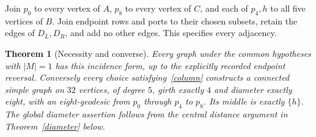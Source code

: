 \documentclass[11pt]{article}
\newtheorem{theorem}{Theorem}
\begin{document}
Join $p_0$ to every vertex of $A$, $p_8$ to every vertex of $C$, and each
of $p_4,h$ to all five vertices of $B$. Join endpoint rows and ports to
their chosen subsets, retain the edges of $D_L,D_R$, and add no other
edges. This specifies every adjacency.

\begin{theorem}[Necessity and converse]\label{normalform}
Every graph under the common hypotheses with $|M|=1$ has this incidence
form, up to the explicitly recorded endpoint reversal. Conversely every
choice satisfying~\eqref{column} constructs a connected simple graph on
$32$ vertices, of degree $5$, girth exactly $4$ and diameter exactly eight,
with an eight-geodesic
from $p_0$ through $p_4$ to $p_8$. Its middle is exactly $\{h\}$.
The global diameter assertion follows from the central distance argument
in Theorem~\ref{diameter} below.
\end{theorem}
\end{document}
